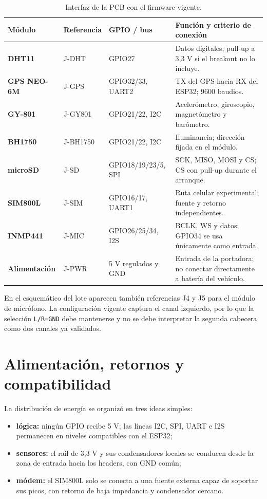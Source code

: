 \documentclass[11pt,a4paper,oneside]{report}
\newcommand{\codigo}[1]{\texttt{\small #1}}
\begin{document}
\begin{table}[H]
\centering
\small
\caption{Interfaz de la PCB con el firmware vigente.}
\label{tab:pines}
\begin{tabularx}{\textwidth}{>{\bfseries}p{3.0cm} p{2.0cm} p{3.1cm} X}
\toprule
Módulo & Referencia & GPIO / bus & Función y criterio de conexión \\
\midrule
DHT11 & J-DHT & GPIO27 & Datos digitales; pull-up a 3,3 V si el breakout no lo incluye. \\
GPS NEO-6M & J-GPS & GPIO32/33, UART2 & TX del GPS hacia RX del ESP32; 9600 baudios. \\
GY-801 & J-GY801 & GPIO21/22, I2C & Acelerómetro, giroscopio, magnetómetro y barómetro. \\
BH1750 & J-BH1750 & GPIO21/22, I2C & Iluminancia; dirección fijada en el módulo. \\
microSD & J-SD & GPIO18/19/23/5, SPI & SCK, MISO, MOSI y CS; CS con pull-up durante el arranque. \\
SIM800L & J-SIM & GPIO16/17, UART1 & Ruta celular experimental; fuente y retorno independientes. \\
INMP441 & J-MIC & GPIO26/25/34, I2S & BCLK, WS y datos; GPIO34 se usa únicamente como entrada. \\
Alimentación & J-PWR & 5 V regulados y GND & Entrada de la portadora; no conectar directamente a batería del vehículo. \\
\bottomrule
\end{tabularx}
\end{table}

En el esquemático del lote aparecen también referencias J4 y J5 para el módulo de
micrófono. La configuración vigente captura el canal izquierdo, por lo que la
selección \codigo{L/R=GND} debe mantenerse y no se debe interpretar la segunda
cabecera como dos canales ya validados.

\section{Alimentación, retornos y compatibilidad}

La distribución de energía se organizó en tres ideas simples:

\begin{itemize}
  \item \textbf{lógica:} ningún GPIO recibe 5 V; las líneas I2C, SPI, UART e I2S
        permanecen en niveles compatibles con el ESP32;
  \item \textbf{sensores:} el rail de 3,3 V y sus condensadores locales se
        conducen desde la zona de entrada hacia los headers, con GND común;
  \item \textbf{módem:} el SIM800L solo se conecta a una fuente externa capaz de
        soportar sus picos, con retorno de baja impedancia y condensador cercano.
\end{itemize}
\end{document}
